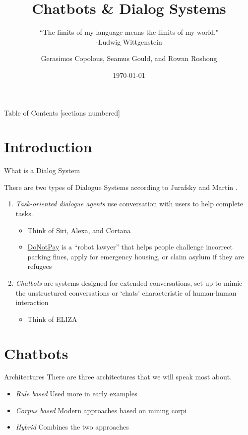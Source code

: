 \documentclass[10pt]{beamer}
\title{Chatbots \& Dialog Systems}
\subtitle{``The limits of my language means the limits of my world." \\ -Ludwig Wittgenstein}
\date{\today}
\author{Gerasimos Copolous, Seamus Gould, and Rowan Roshong}
\institute{Vassar College}
\begin{document}
\maketitle

\begin{frame}{Table of Contents}
  [sections numbered]
  \tableofcontents%
\end{frame}

\section[Introduction]{Introduction}

\begin{frame}[fragile]{What is a Dialog System\?}

There are two types of Dialogue Systems according to Jurafsky and Martin \cite{nlp}.

\begin{enumerate}
    \item \textit{Task-oriented dialogue
agents} use conversation with users to help complete tasks.
\begin{itemize}
    \item Think of Siri, Alexa, and Cortana
    \item \href{https://en.wikipedia.org/wiki/DoNotPay}{DoNotPay} is a “robot lawyer” that helps people challenge incorrect parking fines, apply for emergency housing, or claim asylum if they are refugees
\end{itemize}
\item \textit{Chatbots} are systems designed for extended conversations, set up to mimic
the unstructured conversations or ‘chats’ characteristic of human-human interaction
\begin{itemize}
    \item Think of ELIZA
\end{itemize}
\end{enumerate}
\end{frame}

\section{Chatbots}

\begin{frame}{Architectures}
There are three architectures that we will speak most about.
	\begin{itemize}
	\item \textit{Rule based} Used more in early examples
	\item \textit{Corpus based} Modern approaches based on mining corpi
	\item \textit{Hybrid} Combines the two approaches
	\end{itemize}
\end{frame}
\end{document}
